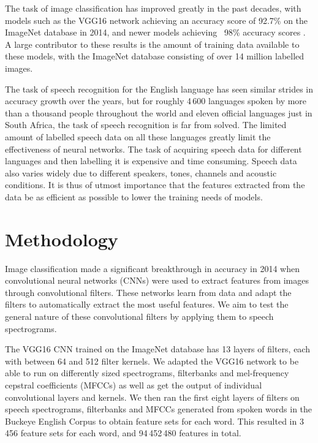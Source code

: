 The task of image classification has improved greatly in the past decades, with models such as the VGG16 network \cite{DBLP:journals/corr/SimonyanZ14a} achieving an accuracy score of 92.7\% on the ImageNet database in 2014, and newer models achieving ~98\% accuracy scores \cite{ILSVRC15}. A large contributor to these results is the amount of training data available to these models, with the ImageNet database consisting of over 14 million labelled images.

The task of speech recognition for the English language has seen similar strides in accuracy growth over the years, but for roughly 4\,600 languages spoken by more than a thousand people throughout the world and eleven official languages just in South Africa, the task of speech recognition is far from solved.
The limited amount of labelled speech data on all these languages greatly limit the effectiveness of neural networks.
The task of acquiring speech data for different languages and then labelling it is expensive and time consuming.
Speech data also varies widely due to different speakers, tones, channels and acoustic conditions.
It is thus of utmost importance that the features extracted from the data be as efficient as possible to lower the training needs of models.

\section{Methodology}

Image classification made a significant breakthrough in accuracy in 2014 when convolutional neural networks (CNNs) were used to extract features from images through convolutional filters.
These networks learn from data and adapt the filters to automatically extract the most useful features.
We aim to test the general nature of these convolutional filters by applying them to speech spectrograms.

The VGG16 CNN trained on the ImageNet database has 13 layers of filters, each with between 64 and 512 filter kernels.
We adapted the VGG16 network to be able to run on differently sized spectrograms, filterbanks and mel-frequency cepstral coefficients (MFCCs) as well as get the output of individual convolutional layers and kernels.
We then ran the first eight layers of filters on speech spectrograms, filterbanks and MFCCs generated from spoken words in the Buckeye English Corpus to obtain feature sets for each word.
This resulted in 3\,456 feature sets for each word, and 94\,452\,480 features in total.

